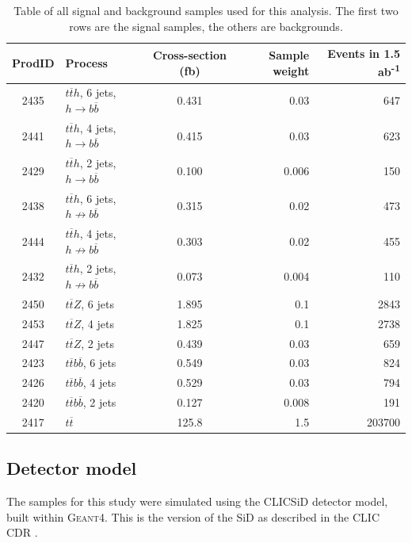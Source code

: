 \begin{table}[htp]
\centering
	\begin{tabular}{ c l c r r }
	\hline \hline
	\textbf{ProdID} & \textbf{Process} & \textbf{Cross-section (fb)} & \textbf{Sample weight} & \textbf{Events in 1.5 ab\textsuperscript{-1}} \\ \hline
	2435 & $t\overline{t}h$, 6 jets, $h \rightarrow b\overline{b}$ & 0.431 & 0.03 & 647 \\
	2441 & $t\overline{t}h$, 4 jets, $h \rightarrow b\overline{b}$ & 0.415 & 0.03 & 623 \\ \hline
	2429 & $t\overline{t}h$, 2 jets, $h \rightarrow b\overline{b}$ & 0.100 & 0.006 & 150 \\

	2438 & $t\overline{t}h$, 6 jets, $h \not\rightarrow b\overline{b}$ & 0.315 & 0.02 & 473	 \\
	2444 & $t\overline{t}h$, 4 jets, $h \not\rightarrow b\overline{b}$ & 0.303 & 0.02 & 455 \\
	2432 & $t\overline{t}h$, 2 jets, $h \not\rightarrow b\overline{b}$ & 0.073 & 0.004 & 110 \\

	2450 & $t\overline{t}Z$, 6 jets & 1.895 & 0.1 & 2843 \\
	2453 & $t\overline{t}Z$, 4 jets & 1.825 & 0.1 & 2738 \\
	2447 & $t\overline{t}Z$, 2 jets & 0.439 & 0.03 & 659 \\
	
	2423 & $t\overline{t}b\overline{b}$, 6 jets & 0.549 & 0.03 & 824 \\
	2426 & $t\overline{t}b\overline{b}$, 4 jets & 0.529 & 0.03 & 794 \\
	2420 & $t\overline{t}b\overline{b}$, 2 jets & 0.127 & 0.008 & 191 \\

	2417 & $t\overline{t}$ & 125.8 & 1.5 & 203700 \\ \hline \hline

	\end{tabular}
	\caption{Table of all signal and background samples used for this analysis. The first two rows are the signal samples, the others are backgrounds.}
	\label{table:physics/SM/generatedsamples}
\end{table}

\subsection{Detector model}
The samples for this study were simulated using the CLIC\textunderscore SiD detector model, built within \textsc{Geant4}\cite{clic-sid-geant4}. This is the version of the \acrfull{SiD} as described in the \acrlong{CLIC} \acrfull{CDR} \cite{clic-cdr-physicsanddetector} .

